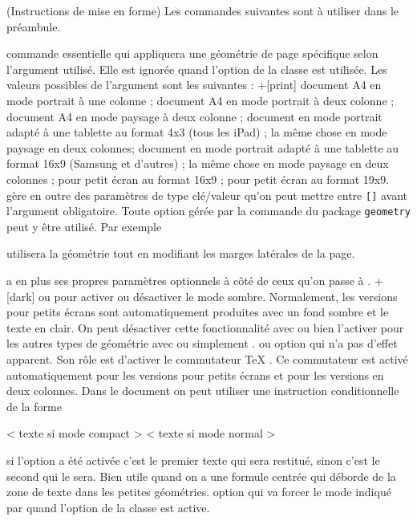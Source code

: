 \documentclass[11pt,report,oneside,solution]{cpgedev}
\let\CMD\cmd
\renewcommand\cmd[1]{{\spotcolor\CMD{#1}}}
\let\OPT\opt
\renewcommand\opt[1]{{\spotcolor\OPT{#1}}}
\def\CMDitem#1{\cmditem{\spotcolor #1}\leavevmode\linebreak}
\begin{document}
\partie(Instructions de mise en forme)
Les commandes suivantes sont à utiliser dans le préambule. 
\begin{ltxsyntax}
     \CMDitem{cpgegeometry{}}
          commande essentielle qui appliquera une géométrie de page spécifique selon l'argument utilisé. Elle est ignorée quand l'option  de la classe est utilisée. Les valeurs possibles de l'argument sont les suivantes :
          \xopt+[print] 
               document A4 en mode portrait à une colonne ;
          \xopt[2print] 
               document A4 en mode portrait à deux colonne ;
          \xopt[lsprint] 
               document A4 en mode paysage à deux colonne ;
          \xopt[tablet] 
               document en mode portrait adapté à une tablette au format 4x3 (tous les iPad) ;
          \xopt[lstablet] 
               la même chose en mode paysage en deux colonnes;
          \xopt[alttablet] 
               document en mode portrait adapté à une tablette au format 16x9 (Samsung et d'autres) ;
          \xopt[alttablet] 
               la même chose en mode paysage en deux colonnes ;
          \xopt[phone] 
               pour petit écran au format 16x9 ;
          \xopt[altphone] 
               pour petit écran au format 19x9.
          \exit 
{} gère en outre des paramètres de type  clé/valeur qu'on peut mettre entre \verb+[]+ avant l'argument obligatoire. Toute option gérée par la commande  du package \texttt{geometry} peut y être utilisé. Par exemple 
\begin{latex}[]
\end{latex}
utilisera la géométrie  tout en modifiant les marges latérales de la page.

 a en plus ses propres paramètres optionnels à côté de ceux qu'on passe à . 
\xopt+[dark] 
     ou  pour activer ou désactiver le mode sombre. Normalement, les versions pour petits écrans sont automatiquement produites avec un fond sombre et le texte en clair. On peut désactiver cette fonctionnalité avec  ou bien l'activer pour les autres types de géométrie avec  ou simplement . 
 ou 
     option qui n'a pas d'effet apparent. Son rôle est d'activer le commutateur \TeX{} . Ce commutateur est activé automatiquement pour les versions pour petits écrans et pour les versions en deux colonnes. Dans le document on peut utiliser une instruction conditionnelle de la forme   
\begin{latex}[]
\ifcompact 
     < texte si mode compact >
\else 
     < texte si mode normal >
\fi 
\end{latex}
     si l'option  a été activée c'est le premier texte qui sera restitué, sinon c'est le second qui le sera. Bien utile quand on a une formule centrée qui déborde de la zone de texte dans les petites géométries. 
     option qui va forcer le mode indiqué par  quand l'option  de la classe est active. 
\exit   
\end{ltxsyntax}
\end{document}
